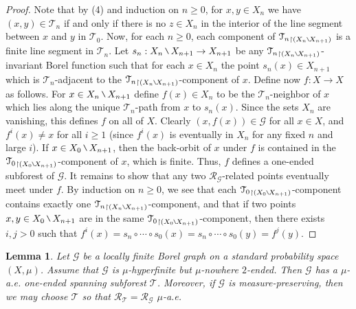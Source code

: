 \documentclass[11pt]{amsart}
\theoremstyle{definition}
\theoremstyle{plain}
\newtheorem{lemma}[definition]{Lemma}
\newcommand{\<}{\langle}
\renewcommand{\>}{\rangle}
\newcommand{\Ggraph}{\mathcal{G}}
\newcommand{\Tgraph}{\mathcal{T}}
\newcommand\RR{\mathscr{R}}
\newcommand{\mysetminusD}{\hbox{\tikz{\draw[line width=0.6pt,line cap=round] (3pt,0) -- (0,6pt);}}}
\newcommand{\mysetminusT}{\mysetminusD}
\newcommand{\mysetminusS}{\hbox{\tikz{\draw[line width=0.45pt,line cap=round] (2pt,0) -- (0,4pt);}}}
\newcommand{\mysetminusSS}{\hbox{\tikz{\draw[line width=0.4pt,line cap=round] (1.5pt,0) -- (0,3pt);}}}
\newcommand{\mysetminus}{\mathbin{\mathchoice{\mysetminusD}{\mysetminusT}{\mysetminusS}{\mysetminusSS}}}%
\begin{document}
\begin{proof}
Note that by (4) and induction on $n\geq 0$, for $x,y\in X_{n}$ we have $(x,y)\in {\Tgraph}_{n}$ if and only if there is no $z\in X_{n}$ in the interior of the line segment between $x$ and $y$ in ${\Tgraph}_0$. Now, for each $n\geq 0$, each component of ${{\Tgraph}_n}_{\restriction (X_n\mysetminus X_{n+1})}$ is a finite line segment in ${\Tgraph}_n$. Let $s_n:X_n\mysetminus X_{n+1} \rightarrow X_{n+1}$ be any ${{\Tgraph}_n}_{\restriction (X_n\mysetminus X_{n+1})}$-invariant Borel function such that for each $x\in X_n$ the point $s_n(x)\in X_{n+1}$ which is ${\Tgraph}_n$-adjacent to the ${{\Tgraph}_n}_{\restriction (X_n\mysetminus X_{n+1})}$-component of $x$. Define now $f:X\rightarrow X$ as follows. For $x\in X_n\mysetminus X_{n+1}$ define $f(x)\in X_n$ to be the ${\Tgraph}_n$-neighbor of $x$ which lies along the unique ${\Tgraph}_n$-path from $x$ to $s_n(x)$. Since the sets $X_n$ are vanishing, this defines $f$ on all of $X$. Clearly $(x,f(x))\in \Ggraph$ for all $x\in X$, and $f^i(x)\neq x$ for all $i\geq 1$ (since $f^i(x)$ is eventually in $X_n$ for any fixed $n$ and large $i$). If $x\in X_0\mysetminus X_{n+1}$, then the back-orbit of $x$ under $f$ is contained in the ${{\Tgraph}_0}_{\restriction (X_0\mysetminus X_{n+1})}$-component of $x$, which is finite. Thus, $f$ defines a one-ended subforest of $\Ggraph$. It remains to show that any two $\RR_{\Ggraph}$-related points eventually meet under $f$. By induction on $n\geq 0$, we see that each ${{\Tgraph}_0}_{\restriction (X_0\mysetminus X_{n+1})}$-component contains exactly one ${{\Tgraph}_n}_{\restriction (X_n\mysetminus X_{n+1} )}$-component, and that if two points $x,y\in X_0\mysetminus X_{n+1}$ are in the same ${{\Tgraph}_0}_{\restriction (X_0\mysetminus X_{n+1})}$-component, then there exists $i,j>0$ such that $f^i(x)=s_n\circ\cdots\circ s_0 (x)= s_n\circ\cdots\circ s_0 (y) = f^j(y)$.
\end{proof}


\begin{lemma}\label{lem:hyperfinite}
Let $\Ggraph$ be a locally finite Borel graph on a standard probability
space $(X,\mu )$. Assume that $\Ggraph$ is $\mu$-hyperfinite but $\mu$-nowhere $2$-ended. Then
$\Ggraph$ has a $\mu$-a.e. one-ended spanning subforest $\Tgraph$.
Moreover, if $\Ggraph$ is measure-preserving, then we may choose
$\Tgraph$ so that $\RR_\Tgraph = \RR_\Ggraph$
$\mu$-a.e.
\end{lemma}
\end{document}
